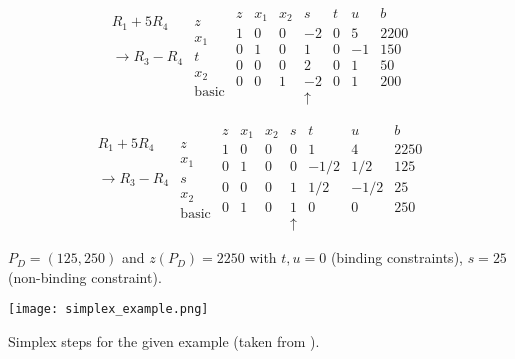 \begin{equation*}
\begin{array}{cc}
&\\
R_1+5R_4&z \\
&x_1 \\
\rightarrow R_3-R_4&t \\
&x_2\\
&\mathrm{basic} \\
\end{array}
\begin{array}{c|ccccc|c}
  z & x_1 & x_2 & s & t & u & b \\ \hline
  1 & 0 & 0 & -2 & 0 & 5 & 2200 \\ \hline
  0 & 1 & 0 & 1 & 0 & -1 & 150  \\
  0 & 0 & 0 & 2 & 0 & 1 & 50 \\
  0 & 0 & 1 & -2 & 0 & 1 & 200 \\
    &  & & \uparrow& & &
\end{array}
\end{equation*}

\begin{equation*}
\begin{array}{cc}
&\\
R_1+5R_4&z \\
&x_1 \\
\rightarrow R_3-R_4&s \\
&x_2\\
&\mathrm{basic} \\
\end{array}
\begin{array}{c|ccccc|c}
  z & x_1 & x_2 & s & t & u & b \\ \hline
  1 & 0 & 0 & 0 & 1 & 4 & 2250 \\ \hline
  0 & 1 & 0 & 0 & -1/2 & 1/2 & 125  \\
  0 & 0 & 0 & 1 & 1/2 & -1/2 & 25 \\
  0 & 1 & 0 & 1 & 0 & 0 & 250 \\
    &  & & \uparrow& & &
\end{array}
\end{equation*}

$\boxed{P_D=(125,250)}$ and $\boxed{z(P_D)=2250}$ with $t,u=0$ (binding constraints), $s=25$ (non-binding constraint).


  \begin{center}
    \texttt{[image: simplex\_example.png]}
  \end{center}
  Simplex steps for the given example (taken from \cite{carter_operations_2019}).

